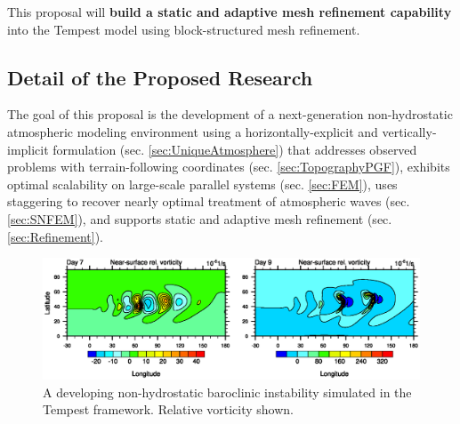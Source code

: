\documentclass[11pt]{article}
\begin{document}
This proposal will \textbf{build a static and adaptive mesh refinement capability} into the Tempest model using block-structured mesh refinement.


\subsection{Detail of the Proposed Research} \label{sec:Research}

The goal of this proposal is the development of a next-generation non-hydrostatic atmospheric modeling environment using a horizontally-explicit and vertically-implicit formulation (sec. \ref{sec:UniqueAtmosphere}) that addresses observed problems with terrain-following coordinates (sec. \ref{sec:TopographyPGF}), exhibits optimal scalability on large-scale parallel systems (sec. \ref{sec:FEM}), uses staggering to recover nearly optimal treatment of atmospheric waves (sec. \ref{sec:SNFEM}), and supports static and adaptive mesh refinement (sec. \ref{sec:Refinement}).

\begin{figure}[t]
\begin{center}
\includegraphics[width=6in]{UMJSTest-Results}
\end{center}
\caption{A developing non-hydrostatic baroclinic instability simulated in the Tempest framework.  Relative vorticity shown.} \label{fig:TempestBaroclinicInstability}
\end{figure}
\end{document}
